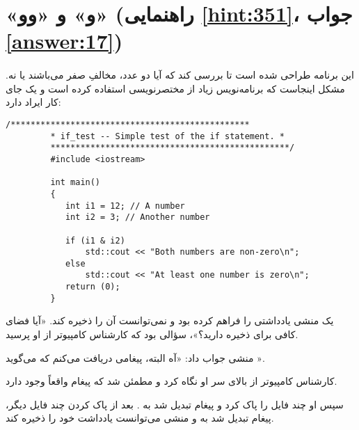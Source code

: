 \section[«و» و «وو»]{«و» و «وو» \protect{} (راهنمایی \ref{hint:351}، جواب \ref{answer:17})}
\paragraph{}\label{prog:27}
این برنامه طراحی شده است تا بررسی کند که آیا دو عدد، مخالفِ صفر می‌باشند یا نه. مشکل اینجاست که برنامه‌نویس زیاد از مختصرنویسی استفاده کرده است و یک جای کار ایراد دارد:

\begin{LTR}
    \begin{lstlisting}[style=C++Style]
         /************************************************
         * if_test -- Simple test of the if statement. *
         ************************************************/
         #include <iostream>

         int main()
         {
         	int i1 = 12; // A number
         	int i2 = 3; // Another number

        	if (i1 & i2)
        		std::cout << "Both numbers are non-zero\n";
         	else
         		std::cout << "At least one number is zero\n";
         	return (0);
         }
    \end{lstlisting}
\end{LTR}

\begin{tcolorbox}
    یک منشی یادداشتی را فراهم کرده بود و نمی‌توانست آن را ذخیره کند. «آیا فضای کافی برای ذخیره دارید؟»، سؤالی بود که کارشناس کامپیوتر از او پرسید.

    منشی جواب داد: «آه البته، پیغامی دریافت می‌کنم که می‌گوید ».

    کارشناس کامپیوتر از بالای سر او نگاه کرد و مطمئن شد که پیغام  واقعاً وجود دارد.

    سپس او چند فایل را پاک کرد و پیغام تبدیل شد به . بعد از پاک کردن چند فایل دیگر، پیغام تبدیل شد به  و منشی می‌توانست یادداشت خود را ذخیره کند.
\end{tcolorbox}